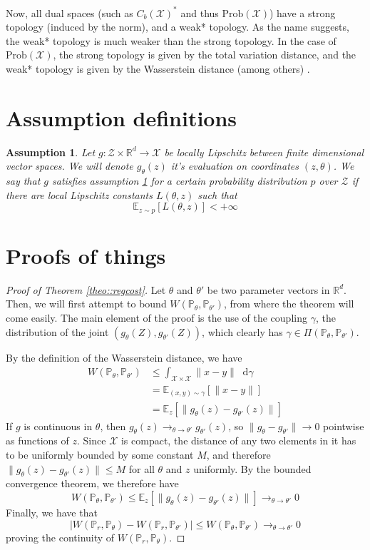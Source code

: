 \documentclass{article} %
\newcommand\EE{\mathbb{E}}
\newcommand\PP{\mathbb{P}}
\newcommand\RR{\mathbb{R}}
\newtheorem{ass}{Assumption}
\theoremstyle{definition}
\theoremstyle{definition}
\newcommand*\diff{\mathop{}\!\mathrm{d}}
\newcommand\manX{\mathcal{X}}
\begin{document}
\begin{appendices}
Now, all dual spaces (such as $C_b(\manX)^*$ and thus
$\text{Prob}(\manX)$) have a strong topology (induced by the norm),
and a weak* topology. As the name suggests, the weak* topology
is much weaker than the strong topology. In the case of
$\text{Prob}(\manX)$, the strong topology is given by the
total variation distance, and the weak* topology is given
by the Wasserstein distance (among others) \cite{Vil}.
\section{Assumption definitions}

\begin{ass} \label{ass::lip}
Let $g: \mathcal{Z} \times \RR^d \rightarrow \mathcal{X}$ be
locally Lipschitz between finite dimensional vector spaces.
We will denote $g_\theta(z)$ it's evaluation on coordinates
$(z, \theta)$. We say that $g$ satisfies assumption \ref{ass::lip}
for a certain probability distribution $p$ over $\mathcal{Z}$
if there are local Lipschitz constants $L(\theta, z)$ such
that
$$ \EE_{z \sim p}[L(\theta, z)] < +\infty $$ 
\end{ass}

\section{Proofs of things} \label{app::proofs}

\begin{proof}[Proof of Theorem \ref{theo::regcost}]
Let $\theta$ and $\theta'$ be two parameter vectors in $\RR^d$. Then, we 
will first attempt to bound $W(\PP_\theta, \PP_{\theta'})$, from where the
theorem will come easily. The main element of the proof is the use of the
coupling $\gamma$, the distribution of the joint $(g_\theta(Z), g_{\theta'}(Z))$,
which clearly has $\gamma \in \Pi(\PP_\theta, \PP_{\theta'})$.

By the definition of the Wasserstein distance, we have
\begin{align*}
  W(\PP_\theta, \PP_{\theta'}) &\leq \int_{\manX \times \manX} \|x - y\| \diff \gamma \\
&= \EE_{(x, y) \sim \gamma} [\|x - y \|] \\
&= \EE_{z}[\|g_\theta(z) - g_{\theta'}(z)\|]
\end{align*}
If $g$ is continuous in $\theta$, then $g_\theta(z) \to_{\theta \to \theta'} g_{\theta'}(z)$,
so $\|g_\theta - g_{\theta'}\| \to 0$ pointwise as functions of $z$. Since
$\manX$ is compact, the distance of any two elements in it has to be uniformly bounded by
some constant $M$, and therefore $\|g_\theta(z) - g_{\theta'}(z)\| \leq M$ for
all $\theta$ and $z$ uniformly. By the bounded convergence theorem, we therefore
have
$$ W(\PP_\theta, \PP_{\theta'}) \leq \EE_{z}[\|g_\theta(z) - g_{\theta'}(z)\|] \to_{\theta \to \theta'} 0 $$
Finally, we have that
$$ |W(\PP_r, \PP_\theta) - W(\PP_r, \PP_{\theta'}) | \leq W(\PP_\theta, \PP_{\theta'}) \to_{\theta \to \theta'} 0 $$
proving the continuity of $W(\PP_r, \PP_\theta)$.


\end{proof}
\end{appendices}
\end{document}
